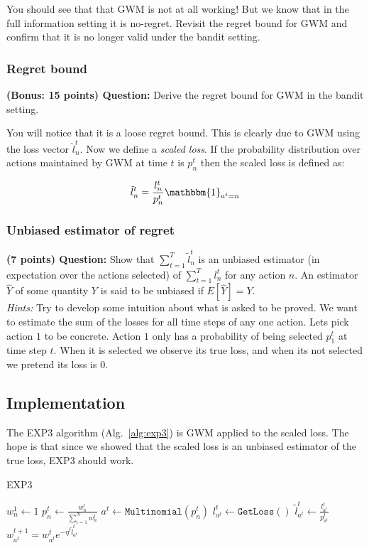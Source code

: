 \documentclass{article}
\newcommand{\tl}{\tilde{l}}
\newcommand{\Ind}[1]{\mathbbm{1}_{#1}}
\begin{document}
\noindent You should see that that GWM is not at all working! But we know that in the full information setting it is no-regret. Revisit the regret bound for GWM and confirm that it is no longer valid under the bandit setting.

\subsubsection{Regret bound} 
\textbf{(Bonus: 15 points) Question:} Derive the regret bound for GWM in the bandit setting.

You will notice that it is a loose regret bound. This is clearly due to GWM using the loss vector $\hat{l}^t_n$. Now we define a \emph{scaled loss}. If the probability distribution over actions maintained by GWM at time $t$ is $p^t_n$ then the scaled loss is defined as:

\begin{equation}
\tl^t_n = \frac{l^t_n}{p^t_n} \Ind{a^t=n}
\end{equation}

\subsubsection{Unbiased estimator of regret} 

\textbf{(7 points) Question:} Show that $\sum\limits_{t=1}^T \tl^t_n$ is an unbiased estimator (in expectation over the actions selected) of $\sum\limits_{t=1}^T l^t_n$ for any action $n$. An estimator $\hat{Y}$ of some quantity $Y$ is said to be unbiased if $E[\hat{Y}] = Y$.\\

\noindent\textit{Hints:} Try to develop some intuition about what is asked to be proved. We want to estimate the sum of the losses for all time steps of any one action. Lets pick action $1$ to be concrete. Action $1$ only has a probability of being selected $p^t_1$ at time step $t$. When it is selected we observe its true loss, and when its not selected we pretend its loss is $0$. 

\subsection{Implementation}

The EXP3 algorithm (Alg.~\ref{alg:exp3}) is GWM applied to the scaled loss. The hope is that since we showed that the scaled loss is an unbiased estimator of the true loss, EXP3 should work. 

\begin{algorithm}
    \label{alg:exp3}
    \caption{EXP3} 
   
    $w^1_n \gets 1$\;
    {
    $p_n^t \gets \frac{w_n^t}{\sum_{i=1}^N w_n^t}$ \;
    	$a^t \gets \mathtt{Multinomial}(p^t_n)$\;
    	$l^t_{a^t} \gets \mathtt{GetLoss}()$\;
    	$\tilde{l}^t_{a^t} \gets \frac{l^t_{a^t}}{p^t_{a^t}} $\;
    	$w^{t+1}_{a^t} = w^t_{a^t} e^{-\eta^t \tilde{l}^t_{a^t}}$\;
    }
\end{algorithm}
\end{document}
